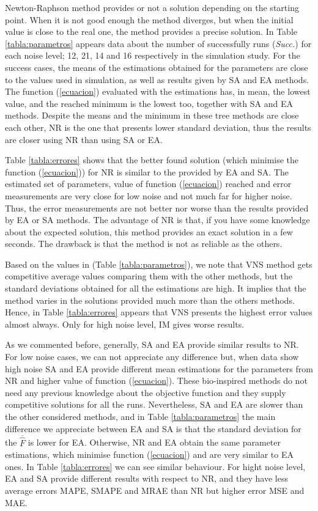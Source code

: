 \documentclass{sig-alternate}
\begin{document}
Newton-Raphson method provides or not a solution depending on the starting point. When it is not good enough the method diverges, but when the initial value is close to the real one, the method provides a precise solution. In Table \ref{tabla:parametros} appears data about the number of successfully runs (\emph{Succ.}) for each noise level; 12, 21, 14 and 16 respectively in the simulation study. For the success cases, the means of the estimations obtained for the parameters are close to the values used in simulation, as well as results given by SA and EA methods. The function (\ref{ecuacion}) evaluated with the estimations has, in mean, the lowest value, and the reached minimum is the lowest too, together with SA and EA methods. Despite the means and the minimum in these tree methods are close each other, NR is the one that presents lower standard deviation, thus the results are closer using NR than using SA or EA.

Table \ref{tabla:errores} shows that the better found solution (which minimise the function (\ref{ecuacion})) for NR is similar to the provided by EA and SA. The estimated set of parameters, value of function (\ref{ecuacion}) reached and error measurements are very close for low noise and not much far for higher noise. Thus, the error measurements are not better nor worse than the results provided by EA or SA methods. The advantage of NR is that, if you have some knowledge about the expected solution, this method provides an exact solution in a few seconds. The drawback is that the method is not as reliable as the others.

Based on the values in (Table \ref{tabla:parametros}), we note that VNS method gets competitive average values comparing them with the other methods, but the standard deviations obtained for all the estimations are high. It implies that the method varies in the solutions provided much more than the others methods. Hence, in Table \ref{tabla:errores} appears that VNS presents the highest error values almost always. Only for high noise level, IM gives worse results.

As we commented before, generally, SA and EA provide similar results to NR. For low noise cases, we can not appreciate any difference but, when data show high noise SA and EA provide different mean estimations for the parameters from NR and higher value of function (\ref{ecuacion}).
These bio-inspired methods do not need any previous knowledge about the objective function and they supply competitive solutions for all the runs. Nevertheless, SA and EA are slower than the other considered methods, and in Table \ref{tabla:parametros} the main difference we appreciate between EA and SA is that the standard deviation for the $\overline{\hat F}$ is lower for EA. Otherwise, NR and EA obtain the same parameter estimations, which minimise function (\ref{ecuacion}) and are very similar to EA ones. In Table \ref{tabla:errores} we can see similar behaviour. For hight noise level, EA and SA provide different results with respect to NR, and they have less average errors MAPE, SMAPE and MRAE than NR but higher error MSE and MAE.
\end{document}
